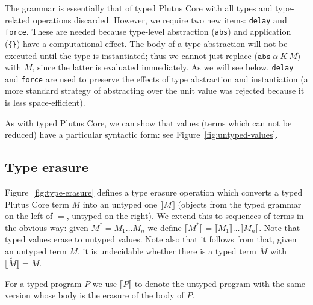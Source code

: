 \documentclass[a4paper]{article}
\newcommand{\keyword}[1]{\texttt{#1}}
\newcommand{\construct}[1]{\texttt{(} #1 \texttt{)}}
\newcommand{\abs}[3]{\construct{\keyword{abs} ~ #1 ~ #2 ~ #3}}
\newcommand{\lamU}[2]{\construct{\keyword{lam} ~ #1 ~ #2        }}
\newcommand{\appU}[2]{\texttt{[} #1 ~ #2 \texttt{]}}
\newcommand{\delay}[1]{\construct{\keyword{delay} ~ #1}}
\newcommand{\force}[1]{\construct{\keyword{force} ~ #1}}
\newcommand{\erase}[1]{\llbracket#1\rrbracket}
\begin{document}


\bigskip
\noindent The grammar is essentially that of typed Plutus Core with all types
and type-related operations discarded.  However, we require two new
items: \texttt{delay} and \texttt{force}.  These are needed because
type-level abstraction (\texttt{abs}) and application (\texttt{\{\}})
have a computational effect.  The body of a type abstraction will not
be executed until the type is instantiated; thus we cannot just
replace $\abs{\alpha}{K}{M}$ with $M$, since the latter is evaluated
immediately.  As we will see below, \texttt{delay} and \texttt{force}
are used to preserve the effects of type abstraction and
instantiation (a more standard strategy of abstracting over the unit value was
rejected because it is less space-efficient).%

As with typed Plutus Core, we can show that values (terms which can
not be reduced) have a particular syntactic form: see
Figure~\ref{fig:untyped-values}.

\subsection{Type erasure}
Figure~\ref{fig:type-erasure} defines a type erasure operation which
converts a typed Plutus Core term $M$ into an untyped one $\erase{M}$
(objects from the typed grammar on the left of $=$, untyped on the
right).  We extend this to sequences of terms in the obvious way:
given $M^* = M_1 \ldots M_n$ we define $\erase{M^*}
= \erase{M_1} \ldots \erase{M_n}$.  Note that typed values erase to
untyped values.  Note also that it follows
from \cite{Wells-96-typability} that, given an untyped term $M$, it is
undecidable whether there is a typed term $\widetilde{M}$ with $\erase{\widetilde{M}} = M$.

For a typed program $P$ we use $\erase{P}$ to denote the untyped
program with the same version whose body is the erasure of the body of
$P$.
\end{document}

